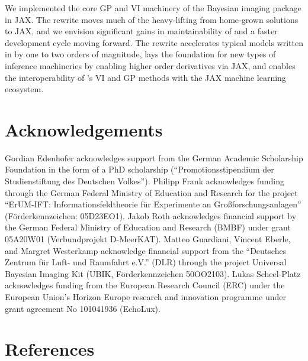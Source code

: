 \documentclass[10pt,a4paper,onecolumn]{article}
\let\textttOrig=\texttt
\def\texttt#1{\expandafter\textttOrig{\seqsplit{#1}}}
\begin{document}
We implemented the core GP and VI machinery of the Bayesian imaging
package \texttt{NIFTy} in JAX. The rewrite moves much of the
heavy-lifting from home-grown solutions to JAX, and we envision
significant gains in maintainability of \texttt{NIFTy.re} and a faster
development cycle moving forward. The rewrite accelerates typical models
written in \texttt{NIFTy} by one to two orders of magnitude, lays the
foundation for new types of inference machineries by enabling higher
order derivatives via JAX, and enables the interoperability of
\texttt{NIFTy}'s VI and GP methods with the JAX machine learning
ecosystem.

\hypertarget{acknowledgements}{%
\section{Acknowledgements}\label{acknowledgements}}

Gordian Edenhofer acknowledges support from the German Academic
Scholarship Foundation in the form of a PhD scholarship
(``Promotionsstipendium der Studienstiftung des Deutschen Volkes'').
Philipp Frank acknowledges funding through the German Federal Ministry
of Education and Research for the project ``ErUM-IFT:
Informationsfeldtheorie für Experimente an Großforschungsanlagen''
(Förderkennzeichen: 05D23EO1). Jakob Roth acknowledges financial support
by the German Federal Ministry of Education and Research (BMBF) under
grant 05A20W01 (Verbundprojekt D-MeerKAT). Matteo Guardiani, Vincent
Eberle, and Margret Westerkamp acknowledge financial support from the
``Deutsches Zentrum für Luft- und Raumfahrt e.V.'' (DLR) through the
project Universal Bayesian Imaging Kit (UBIK, Förderkennzeichen
50OO2103). Lukas Scheel-Platz acknowledges funding from the European
Research Council (ERC) under the European Union's Horizon Europe
research and innovation programme under grant agreement No 101041936
(EchoLux).

\hypertarget{references}{%
\section{References}\label{references}}
\end{document}

